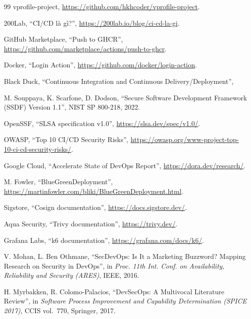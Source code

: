 \documentclass[12pt,a4paper,oneside]{extreport}
\begin{document}
\clearpage
{}
{}
\begin{thebibliography}{99}
  vprofile-project, \url{https://github.com/hkhcoder/vprofile-project}.

  200Lab, ``CI/CD là gì?'', \url{https://200lab.io/blog/ci-cd-la-gi}.

  GitHub Marketplace, ``Push to GHCR'',
  \url{https://github.com/marketplace/actions/push-to-ghcr}.

  Docker, ``Login Action'', \url{https://github.com/docker/login-action}.

  Black Duck, ``Continuous Integration and Continuous Delivery/Deployment'',

  M. Souppaya, K. Scarfone, D. Dodson, ``Secure Software Development Framework
  (SSDF) Version 1.1'', NIST SP 800-218, 2022.

  OpenSSF, ``SLSA specification v1.0'', \url{https://slsa.dev/spec/v1.0/}.

  OWASP, ``Top 10 CI/CD Security Risks'',
  \url{https://owasp.org/www-project-top-10-ci-cd-security-risks/}.

  Google Cloud, ``Accelerate State of DevOps Report'', \url{https://dora.dev/research/}.

  M. Fowler, ``BlueGreenDeployment'',
  \url{https://martinfowler.com/bliki/BlueGreenDeployment.html}.

  Sigstore, ``Cosign documentation'', \url{https://docs.sigstore.dev/}.

  Aqua Security, ``Trivy documentation'', \url{https://trivy.dev/}.

  Grafana Labs, ``k6 documentation'', \url{https://grafana.com/docs/k6/}.

  V. Mohan, L. Ben Othmane, ``SecDevOps: Is It a Marketing Buzzword? Mapping
  Research on Security in DevOps'', in \textit{Proc. 11th Int. Conf. on
  Availability, Reliability and Security (ARES)}, IEEE, 2016.

  H. Myrbakken, R. Colomo-Palacios, ``DevSecOps: A Multivocal Literature
  Review'', in \textit{Software Process Improvement and Capability
  Determination (SPICE 2017)}, CCIS vol.~770, Springer, 2017.


\end{thebibliography}
\end{document}
